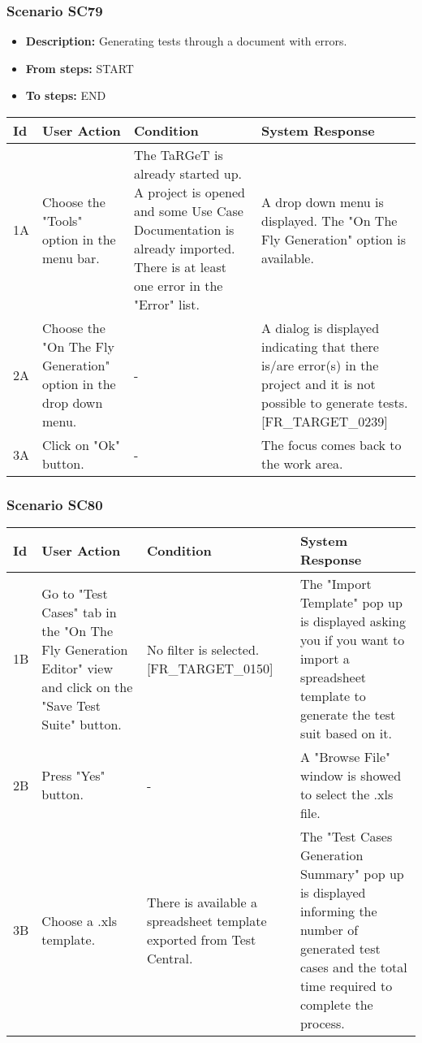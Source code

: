\documentclass[a4paper,11pt]{article}
\newcommand{\bl}{\\ \hline}
\begin{document}
\subsubsection*{Scenario SC79}
\begin{itemize}
\item {\bf Description:} Generating tests through a document with errors.
				
\item {\bf From steps:} START
\item {\bf To steps:} END
\end{itemize}
\begin{tabular}{|p{0.4in}|p{1.5in}|p{1.5in}|p{1.5in}|}
\hline
Id & User Action & Condition & System Response \bl 
1A & Choose the "Tools" option in the menu bar.  & The TaRGeT is already started up. A project is opened
						and some Use Case Documentation is already imported. There is at
						least one error in the "Error" list. & A drop down menu is displayed. The "On The Fly
						Generation" option is available.\bl
2A & Choose the "On The Fly Generation" option in the drop down
						menu.  & - & A dialog is displayed indicating that there is/are
						error(s) in the project and it is not possible to generate tests.
						[FR_TARGET_0239]\bl
3A & Click on "Ok" button. & - & The focus comes back to the work area.\bl
\end{tabular}
\subsubsection*{Scenario SC80}
\begin{tabular}{|p{0.4in}|p{1.5in}|p{1.5in}|p{1.5in}|}
\hline
Id & User Action & Condition & System Response \bl 
1B & Go to "Test Cases" tab in the "On The Fly Generation
						Editor" view and click on the "Save Test Suite" button. & No filter is selected. [FR_TARGET_0150] & The "Import Template" pop up is displayed asking you if
						you want to import a spreadsheet template to generate the test
						suit based on it. \bl
2B & Press "Yes" button. & - & A "Browse File" window is showed to select the .xls file.
					\bl
3B & Choose a .xls template. & There is available a spreadsheet template exported from
						Test Central. & The "Test Cases Generation Summary" pop up is displayed
						informing the number of generated test cases and the total time
						required to complete the process. \bl
\end{tabular}
\end{document}
